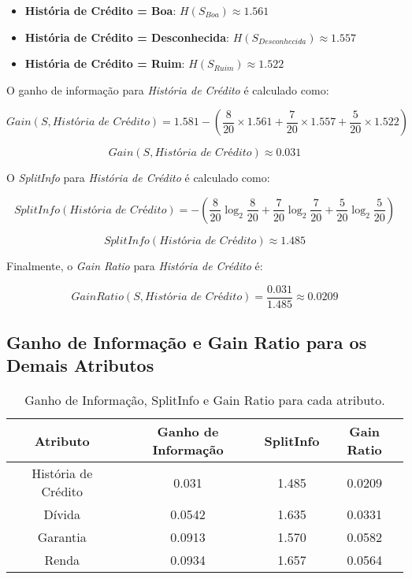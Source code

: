 \documentclass[a4paper,12pt]{article}
\begin{document}
\begin{itemize}
    \item \textbf{História de Crédito = Boa}: \(H(S_{Boa}) \approx 1.561\)
    \item \textbf{História de Crédito = Desconhecida}: \(H(S_{Desconhecida}) \approx 1.557\)
    \item \textbf{História de Crédito = Ruim}: \(H(S_{Ruim}) \approx 1.522\)
\end{itemize}

O ganho de informação para \textit{História de Crédito} é calculado como:

\[
Gain(S, \textit{História de Crédito}) = 1.581 - \left(\frac{8}{20} \times 1.561 + \frac{7}{20} \times 1.557 + \frac{5}{20} \times 1.522\right)
\]

\[
Gain(S, \textit{História de Crédito}) \approx 0.031
\]

O \textit{SplitInfo} para \textit{História de Crédito} é calculado como:

\[
SplitInfo(\textit{História de Crédito}) = -\left(\frac{8}{20} \log_2 \frac{8}{20} + \frac{7}{20} \log_2 \frac{7}{20} + \frac{5}{20} \log_2 \frac{5}{20}\right)
\]

\[
SplitInfo(\textit{História de Crédito}) \approx 1.485
\]

Finalmente, o \textit{Gain Ratio} para \textit{História de Crédito} é:

\[
GainRatio(S, \textit{História de Crédito}) = \frac{0.031}{1.485} \approx 0.0209
\]

\subsection{Ganho de Informação e Gain Ratio para os Demais Atributos}

\begin{table}[H]
\centering
\begin{tabular}{|c|c|c|c|}
\hline
\textbf{Atributo} & \textbf{Ganho de Informação} & \textbf{SplitInfo} & \textbf{Gain Ratio} \\
\hline
História de Crédito & 0.031 & 1.485 & 0.0209 \\
\hline
Dívida & 0.0542 & 1.635 & 0.0331 \\
\hline
Garantia & 0.0913 & 1.570 & 0.0582 \\
\hline
Renda & 0.0934 & 1.657 & 0.0564 \\
\hline
\end{tabular}
\caption{Ganho de Informação, SplitInfo e Gain Ratio para cada atributo.}
\label{tab:gain-ratio}
\end{table}
\end{document}
